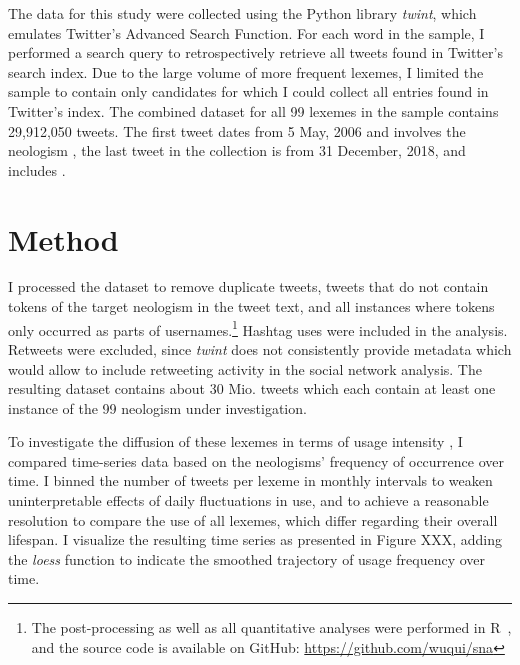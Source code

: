 \documentclass[
  a4paper,
  abstract=on,
  captions=tableabove
  ]{scrartcl}
\begin{document}

    The data for this study were collected using the Python library \emph{twint}, which emulates Twitter's Advanced Search Function. For each word in the sample, I performed a search query to retrospectively retrieve all tweets found in Twitter's search index. Due to the large volume of more frequent lexemes, I limited the sample to contain only candidates for which I could collect all entries found in Twitter's index. The combined dataset for all 99 lexemes in the sample contains 29,912,050 tweets. The first tweet dates from 5 May, 2006 and involves the neologism , the last tweet in the collection is from 31 December, 2018, and includes .

\section{Method}
  \label{sec:method}

  I processed the dataset to remove duplicate tweets, tweets that do not contain tokens of the target neologism in the tweet text, and all instances where tokens only occurred as parts of usernames.\footnote{The post-processing as well as all quantitative analyses were performed in R~\parencite{RCoreTeam2018LanguageEnvironment}, and the source code is available on GitHub: \url{https://github.com/wuqui/sna}} Hashtag uses were included in the analysis. Retweets were excluded, since \emph{twint} does not consistently provide metadata which would allow to include retweeting activity in the social network analysis. The resulting dataset contains about 30 Mio. tweets which each contain at least one instance of the 99 neologism under investigation.

  To investigate the diffusion of these lexemes in terms of usage intensity \parencite{Stefanowitsch2017CorpusbasedPerspective}, I compared time-series data based on the neologisms' frequency of occurrence over time. I binned the number of tweets per lexeme in monthly intervals to weaken uninterpretable effects of daily fluctuations in use, and to achieve a reasonable resolution to compare the use of all lexemes, which differ regarding their overall lifespan. I visualize the resulting time series as presented in Figure XXX, adding the \emph{loess} function to indicate the smoothed trajectory of usage frequency over time.
\end{document}
